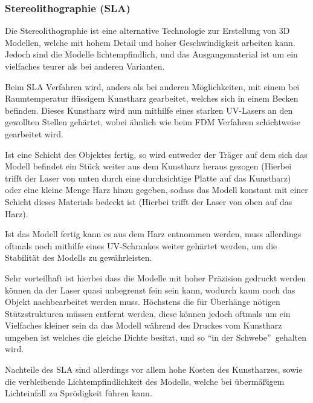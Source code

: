 \subsubsection{Stereolithographie (SLA)}

Die Stereolithographie ist eine alternative Technologie zur Erstellung von 3D Modellen, welche mit hohem Detail und hoher Geschwindigkeit arbeiten kann. Jedoch sind die Modelle lichtempfindlich, und das Ausgangsmaterial ist um ein vielfaches teurer als bei anderen Varianten.

Beim SLA Verfahren wird, anders als bei anderen Möglichkeiten, mit einem bei Raumtemperatur flüssigem Kunstharz gearbeitet, welches sich in einem Becken befinden.
Dieses Kunstharz wird nun mithilfe eines starken UV-Lasers an den gewollten Stellen gehärtet, wobei ähnlich wie beim FDM Verfahren schichtweise gearbeitet wird.

Ist eine Schicht des Objektes fertig, so wird entweder der Träger auf dem sich das Modell befindet ein Stück weiter aus dem Kunstharz heraus gezogen (Hierbei trifft der Laser von unten durch eine durchsichtige Platte auf das Kunstharz) oder eine kleine Menge Harz hinzu gegeben, sodass das Modell konstant mit einer Schicht dieses Materials bedeckt ist (Hierbei trifft der Laser von oben auf das Harz).

Ist das Modell fertig kann es aus dem Harz entnommen werden, muss allerdings oftmals noch mithilfe eines UV-Schrankes weiter gehärtet werden, um die Stabilität des Modells zu gewährleisten.

Sehr vorteilhaft ist hierbei dass die Modelle mit hoher Präzision gedruckt werden können da der Laser quasi unbegrenzt fein sein kann, wodurch kaum noch das Objekt nachbearbeitet werden muss. Höchstens die für Überhänge nötigen Stützstrukturen müssen entfernt werden, diese können jedoch oftmals um ein Vielfaches kleiner sein da das Modell während des Druckes vom Kunstharz umgeben ist welches die gleiche Dichte besitzt, und so \textquotedblleft in der Schwebe\textquotedblright ~gehalten wird.

Nachteile des SLA sind allerdings vor allem hohe Kosten des Kunstharzes, sowie die verbleibende Lichtempfindlichkeit des Modells, welche bei übermäßigem Lichteinfall zu Sprödigkeit führen kann. \parencite[Informationen aus:][]{DRUCKVERFAHREN}